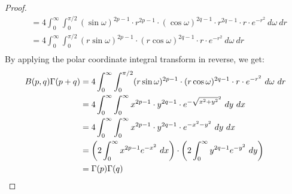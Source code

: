 \begin{example}
\begin{proof}
\begin{align*}
			&=
			4 \int_0^\infty \int_0^{\pi/2} (\sin \omega)^{2p-1} \cdot r^{2p-1} \cdot (\cos \omega)^{2q-1} \cdot r^{2q-1} \cdot r \cdot e^{-r^2} ~d\omega ~dr\\ 
			&=
			4 \int_0^\infty \int_0^{\pi/2} (r\sin \omega)^{2p-1} \cdot (r\cos \omega)^{2q-1} \cdot r \cdot e^{-r^2} ~d\omega ~dr\\ 
		\end{align*}
		By applying the polar coordinate integral transform in reverse, we get:
		\begin{align*}
			B(p,q)\Gamma(p+q) &=
			4 \int_0^\infty \int_0^{\pi/2} (r\sin \omega)^{2p-1} \cdot (r\cos \omega)^{2q-1} \cdot r \cdot e^{-r^2} ~d\omega ~dr\\ 
			&=
			4 \int_0^\infty \int_0^{\infty} x^{2p-1} \cdot y^{2q-1} \cdot e^{-\sqrt{x^2 + y^2}^2} ~dy ~dx\\ 
			&=
			4 \int_0^\infty \int_0^{\infty} x^{2p-1} \cdot y^{2q-1} \cdot e^{-x^2 - y^2} ~dy ~dx\\ 
			&=
			\qty(2 \int_0^\infty x^{2p-1} e^{-x^2} ~dx) \cdot \qty(2 \int_0^\infty y^{2q-1} e^{-y^2} ~dy)\\
			&= \Gamma(p)\Gamma(q)
		\end{align*}
	\end{proof}
\end{example}
\clearpage

